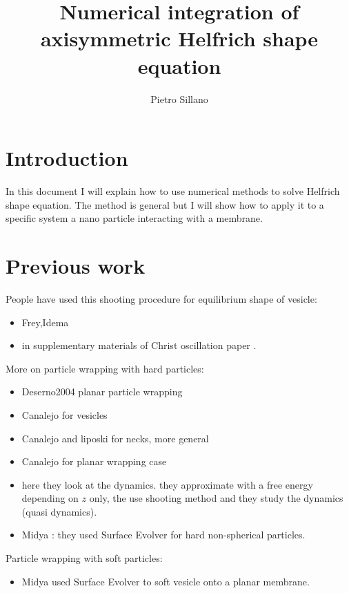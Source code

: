\documentclass[12pt]{article}
\title{Numerical integration of axisymmetric Helfrich shape equation}
\author{Pietro Sillano}
\begin{document}
\maketitle
\tableofcontents



\section{Introduction}
In this document I will explain how to use numerical methods to solve Helfrich shape equation. The method is general but I will show how to apply it to a specific system a nano particle interacting with a membrane. 


\section{Previous work}
People have used this shooting procedure for equilibrium shape of vesicle:
\begin{itemize}
  \item Frey,Idema  \cite{freyMembraneAreaGain2022} 
  \item in supplementary materials of Christ oscillation paper \cite{christActiveShapeOscillations2021}.
\end{itemize}


More on particle wrapping with hard particles:
\begin{itemize}
    \item Deserno2004 planar particle wrapping \cite{desernoElasticDeformationFluid2004}
    \item Canalejo for vesicles \cite{agudo-canalejoCriticalParticleSizes2015} 
    \item Canalejo and liposki for necks, more general \cite{agudo-canalejoStabilizationMembraneNecks2016} 
    \item Canalejo for planar wrapping case \cite{agudo-canalejoParticleEngulfmentStrongly2021a} 
    \item \cite{spankeDynamicsSpontaneousWrapping2022} here they look at the dynamics. they approximate with a free energy depending on $z$ only, the use shooting method and they study the dynamics (quasi dynamics).
    \item Midya \cite{sahuWrappingNonsphericalVesicles2025}: they used Surface Evolver for hard non-spherical particles.
\end{itemize}

Particle wrapping with soft particles:
\begin{itemize}
  \item Midya \cite{midyaMembraneMediatedInteractionsNonspherical2023} used Surface Evolver to soft vesicle onto a planar membrane.
\end{itemize}
\end{document}

